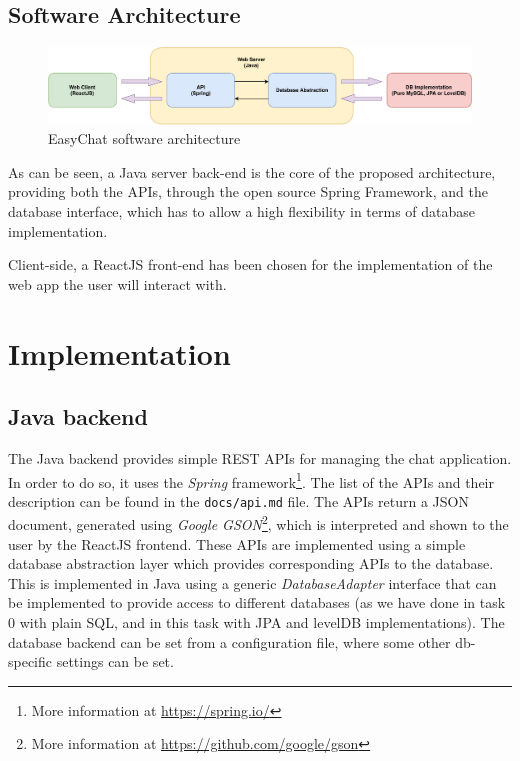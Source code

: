 \documentclass[10pt]{article}
\begin{document}
\subsection{Software Architecture}
\begin{figure}[h!]
	\centering
	\includegraphics[width=\textwidth]{figs/system_architecture}
	\caption{EasyChat software architecture}
	\label{fig:software_architecture}
\end{figure}

As can be seen, a Java server back-end is the core of the proposed architecture, providing both the APIs, through the open source Spring Framework, and the database interface, which has to allow a high flexibility in terms of database implementation.

Client-side, a ReactJS front-end has been chosen for the implementation of the web app the user will interact with.


\clearpage
\section{Implementation}

\subsection{Java backend}
The Java backend provides simple REST APIs for managing the chat application. 
In order to do so, it uses the \emph{Spring} framework\footnote{More information
at \url{https://spring.io/}}.
The list of the APIs and their description can be found in the 
\texttt{docs/api.md} file. The APIs return a JSON document, generated using
\emph{Google GSON}\footnote{More information at 
\url{https://github.com/google/gson}}, which is interpreted and shown to the user
by the ReactJS frontend.
These APIs are implemented using a simple database abstraction layer which provides 
corresponding APIs to the database. This is implemented in Java 
using a generic \emph{DatabaseAdapter} interface that can be implemented to 
provide access to different databases (as we have done in task 0 with plain SQL, 
and in this task with JPA and levelDB implementations). 
The database backend can be set from a configuration
file, where some other db-specific settings can be set.
\end{document}
